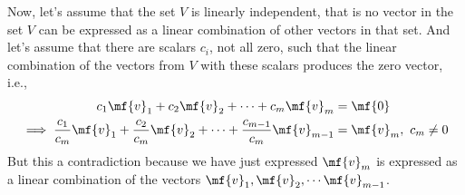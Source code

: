 Now, let's assume that the set $V$ is linearly independent, that is no vector in the set $V$ can be expressed as a linear combination of other vectors in that set. And let's assume that there are scalars $c_i$, not all zero, such that the linear combination of the vectors from $V$ with these scalars produces the zero vector, i.e.,
\[ \begin{split}
    c_1 \mf{v}_1 + c_2 \mf{v}_2 + \cdots + c_m \mf{v}_m &= \mf{0} \\
    \implies \frac{c_1}{c_m} \mf{v}_1 + \frac{c_2}{c_m} \mf{v}_2 + \cdots + \frac{c_{m-1}}{c_m}\mf{v}_{m-1} &= \mf{v}_m, \,\, c_m \neq 0
\end{split} \]
But this a contradiction because we have just expressed $\mf{v}_m$ is expressed as a linear combination of the vectors $\mf{v}_1, \mf{v}_2, \cdots \mf{v}_{m-1}$.

